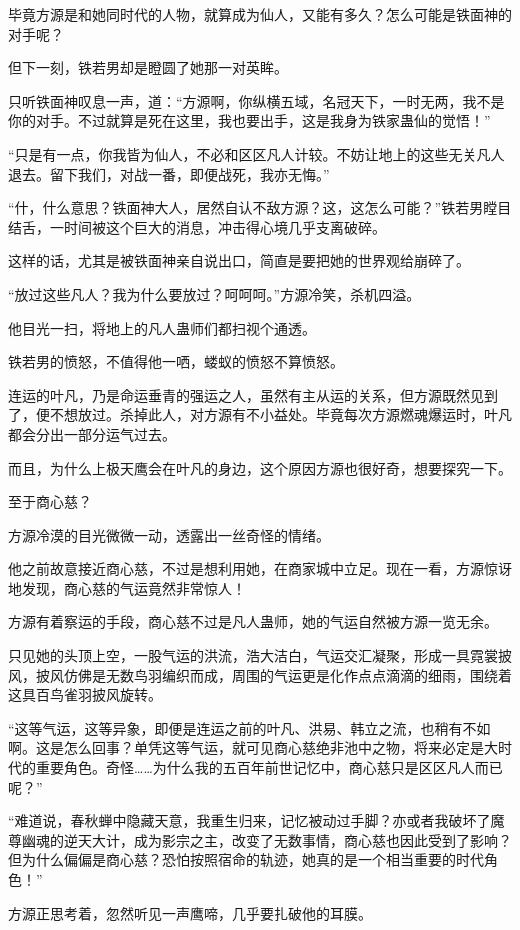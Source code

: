 \begin{this_body}
毕竟方源是和她同时代的人物，就算成为仙人，又能有多久？怎么可能是铁面神的对手呢？

但下一刻，铁若男却是瞪圆了她那一对英眸。

只听铁面神叹息一声，道：“方源啊，你纵横五域，名冠天下，一时无两，我不是你的对手。不过就算是死在这里，我也要出手，这是我身为铁家蛊仙的觉悟！”

“只是有一点，你我皆为仙人，不必和区区凡人计较。不妨让地上的这些无关凡人退去。留下我们，对战一番，即便战死，我亦无悔。”

“什，什么意思？铁面神大人，居然自认不敌方源？这，这怎么可能？”铁若男瞠目结舌，一时间被这个巨大的消息，冲击得心境几乎支离破碎。

这样的话，尤其是被铁面神亲自说出口，简直是要把她的世界观给崩碎了。

“放过这些凡人？我为什么要放过？呵呵呵。”方源冷笑，杀机四溢。

他目光一扫，将地上的凡人蛊师们都扫视个通透。

铁若男的愤怒，不值得他一哂，蝼蚁的愤怒不算愤怒。

连运的叶凡，乃是命运垂青的强运之人，虽然有主从运的关系，但方源既然见到了，便不想放过。杀掉此人，对方源有不小益处。毕竟每次方源燃魂爆运时，叶凡都会分出一部分运气过去。

而且，为什么上极天鹰会在叶凡的身边，这个原因方源也很好奇，想要探究一下。

至于商心慈？

方源冷漠的目光微微一动，透露出一丝奇怪的情绪。

他之前故意接近商心慈，不过是想利用她，在商家城中立足。现在一看，方源惊讶地发现，商心慈的气运竟然非常惊人！

方源有着察运的手段，商心慈不过是凡人蛊师，她的气运自然被方源一览无余。

只见她的头顶上空，一股气运的洪流，浩大洁白，气运交汇凝聚，形成一具霓裳披风，披风仿佛是无数鸟羽编织而成，周围的气运更是化作点点滴滴的细雨，围绕着这具百鸟雀羽披风旋转。

“这等气运，这等异象，即便是连运之前的叶凡、洪易、韩立之流，也稍有不如啊。这是怎么回事？单凭这等气运，就可见商心慈绝非池中之物，将来必定是大时代的重要角色。奇怪……为什么我的五百年前世记忆中，商心慈只是区区凡人而已呢？”

“难道说，春秋蝉中隐藏天意，我重生归来，记忆被动过手脚？亦或者我破坏了魔尊幽魂的逆天大计，成为影宗之主，改变了无数事情，商心慈也因此受到了影响？但为什么偏偏是商心慈？恐怕按照宿命的轨迹，她真的是一个相当重要的时代角色！”

方源正思考着，忽然听见一声鹰啼，几乎要扎破他的耳膜。


\end{this_body}
